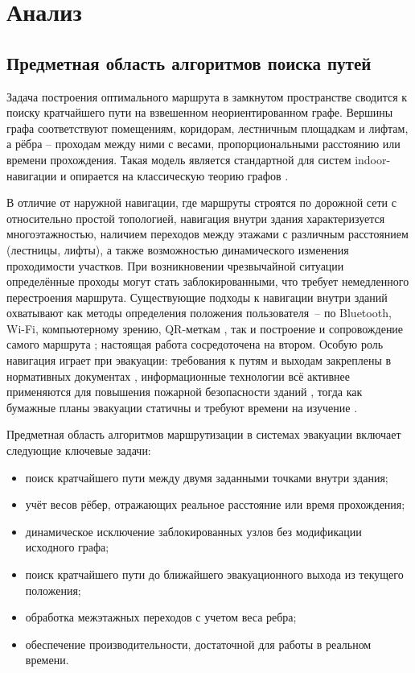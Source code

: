 \section{Анализ}

\subsection{Предметная область алгоритмов поиска путей}

Задача построения оптимального маршрута в замкнутом пространстве сводится к поиску кратчайшего пути на взвешенном неориентированном графе. Вершины графа соответствуют помещениям, коридорам, лестничным площадкам и лифтам, а рёбра -- проходам между ними с весами, пропорциональными расстоянию или времени прохождения. Такая модель является стандартной для систем indoor-навигации \cite{mongush2017} и опирается на классическую теорию графов \cite{zhang2015}.

В отличие от наружной навигации, где маршруты строятся по дорожной сети с относительно простой топологией, навигация внутри здания характеризуется многоэтажностью, наличием переходов между этажами с различным расстоянием (лестницы, лифты), а также возможностью динамического изменения проходимости участков. При возникновении чрезвычайной ситуации определённые проходы могут стать заблокированными, что требует немедленного перестроения маршрута. Существующие подходы к навигации внутри зданий охватывают как методы определения положения пользователя~-- по Bluetooth, Wi-Fi, компьютерному зрению, QR-меткам \cite{grinyak2018,singh2021,tomazic2021}, так и построение и сопровождение самого маршрута \cite{kulikov2021,landau2020,rubio2021,ohotichenko2021}; настоящая работа сосредоточена на втором. Особую роль навигация играет при эвакуации: требования к путям и выходам закреплены в нормативных документах \cite{fz123,sp113130}, информационные технологии всё активнее применяются для повышения пожарной безопасности зданий \cite{gusarova2023}, тогда как бумажные планы эвакуации статичны и требуют времени на изучение \cite{samoshin2026}.

Предметная область алгоритмов маршрутизации в системах эвакуации включает следующие ключевые задачи:
\begin{itemize}
\item поиск кратчайшего пути между двумя заданными точками внутри здания;
\item учёт весов рёбер, отражающих реальное расстояние или время прохождения;
\item динамическое исключение заблокированных узлов без модификации исходного графа;
\item поиск кратчайшего пути до ближайшего эвакуационного выхода из текущего положения;
\item обработка межэтажных переходов с учетом веса ребра;
\item обеспечение производительности, достаточной для работы в реальном времени.
\end{itemize}

